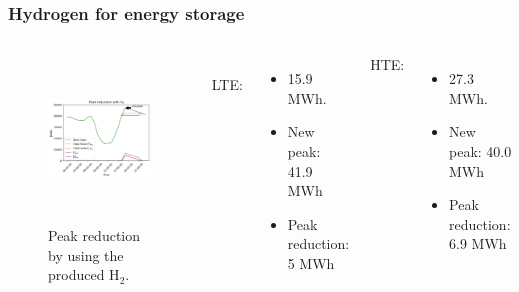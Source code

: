 \begin{frame}
\frametitle{Hydrogen for energy storage}
\begin{columns}
    \column[t]{5cm}
	\begin{figure}[htbp!]
		\begin{center}
			\includegraphics[height=4.4cm]{images/uiuc-hydro3}
		\end{center}
		\caption{Peak reduction by using the produced H$_2$.}
	\end{figure}

    \column[t]{4.5cm}
    \\
    LTE:
    \begin{itemize}
 		\item 15.9 MWh.
 		\item New peak: 41.9 MWh
 		\item Peak reduction: 5 MWh
 	\end{itemize}
    \vspace{0.7cm}

    HTE:
    \begin{itemize}
		\item 27.3 MWh.
		\item New peak: 40.0 MWh
        \item Peak reduction: 6.9 MWh
 	\end{itemize}

\end{columns}
\end{frame}
